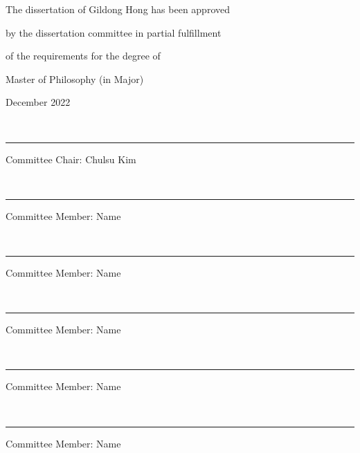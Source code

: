 \documentclass{report}
\begin{document}
\newpage 
\begin{center}
\Large
The dissertation of Gildong Hong has been approved \par %
by the dissertation committee in partial fulfillment\par
of the requirements for the degree of \par
Master of Philosophy (in Major) 
\par\vspace{50pt}
\large December 2022 %
\par\vspace{50pt}
{\small\color{gray}{signiture}}\\[-10pt]\rule{.6\textwidth}{0.4pt}\par
Committee Chair: Chulsu Kim %
\par\vspace{20pt}
{\small\color{gray}{signiture}}\\[-10pt]\rule{.6\textwidth}{0.4pt}\par
Committee Member: Name %
\par\vspace{20pt}
{\small\color{gray}{signiture}}\\[-10pt]\rule{.6\textwidth}{0.4pt}\par
Committee Member: Name %
\par\vspace{20pt}
{\small\color{gray}{signiture}}\\[-10pt]\rule{.6\textwidth}{0.4pt}\par
Committee Member: Name %
\par\vspace{20pt}
{\small\color{gray}{signiture}}\\[-10pt]\rule{.6\textwidth}{0.4pt}\par
Committee Member: Name %
\par\vspace{20pt}
{\small\color{gray}{signiture}}\\[-10pt]\rule{.6\textwidth}{0.4pt}\par
Committee Member: Name %
\end{center}

\newpage ~ 
\end{document}
